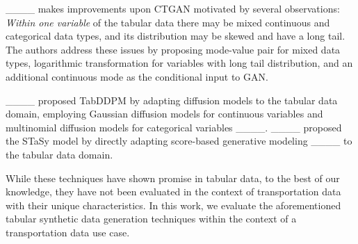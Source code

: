 ____ makes improvements upon CTGAN motivated by several observations: \emph{Within one variable} of the tabular data there may be mixed continuous and categorical data types, and its distribution may be skewed and have a long tail. The authors address these issues by proposing mode-value pair for mixed data types, logarithmic transformation for variables with long tail distribution, and an additional continuous mode as the conditional input to GAN.

____ proposed TabDDPM by adapting diffusion models to the tabular data domain, employing Gaussian diffusion models for continuous variables and multinomial diffusion models for categorical variables ____. ____ proposed the STaSy model by directly adapting score-based generative modeling ____ to the tabular data domain.

While these techniques have shown promise in tabular data, to the best of our knowledge, they have not been evaluated in the context of transportation data with their unique characteristics. 
In this work, we evaluate the aforementioned tabular synthetic data generation techniques within the context of a transportation data use case.

